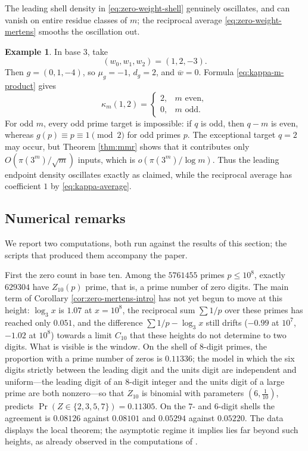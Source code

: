 \documentclass[11pt,reqno]{amsart}
\theoremstyle{plain}
\theoremstyle{definition}
\newtheorem{example}[theorem]{Example}
\newcommand{\1}{\mathbf 1}
\begin{document}
The leading shell density in \eqref{eq:zero-weight-shell} genuinely oscillates, and can vanish on entire residue classes of $m$; the reciprocal average \eqref{eq:zero-weight-mertens} smooths the oscillation out.

\begin{example}\label{ex:alternating-shells}
In base $3$, take
\[
 (w_0,w_1,w_2)=(1,2,-3).
\]
Then $g=(0,1,-4)$, so $\mu_g=-1$, $d_g=2$, and $\overline w=0$.  Formula \eqref{eq:kappa-m-product} gives
\[
 \kappa_m(1,2)=
 \begin{cases}
 2,&m\text{ even},\\
 0,&m\text{ odd}.
 \end{cases}
\]
For odd $m$, every odd prime target is impossible: if $q$ is odd, then $q-m$ is even, whereas $g(p)\equiv p\equiv1\pmod2$ for odd primes $p$.  The exceptional target $q=2$ may occur, but Theorem \ref{thm:mmr} shows that it contributes only $O(\pi(3^m)/\sqrt m)$ inputs, which is $o(\pi(3^m)/\log m)$.  Thus the leading endpoint density oscillates exactly as claimed, while the reciprocal average has coefficient $1$ by \eqref{eq:kappa-average}.
\end{example}

\subsection{Numerical remarks}\label{sec:numerics}
We report two computations, both run against the results of this section; the scripts that produced them accompany the paper.

First the zero count in base ten.  Among the $5761455$ primes $p\le10^{8}$, exactly $629304$ have $Z_{10}(p)$ prime, that is, a prime number of zero digits.  The main term of Corollary \ref{cor:zero-mertens-intro} has not yet begun to move at this height: $\log_3x$ is $1.07$ at $x=10^{8}$, the reciprocal sum $\sum 1/p$ over these primes has reached only $0.051$, and the difference $\sum1/p-\log_3x$ still drifts ($-0.99$ at $10^{7}$, $-1.02$ at $10^{8}$) towards a limit $C_{10}$ that these heights do not determine to two digits.  What is visible is the window.  On the shell of $8$-digit primes, the proportion with a prime number of zeros is $0.11336$; the model in which the six digits strictly between the leading digit and the units digit are independent and uniform---the leading digit of an $8$-digit integer and the units digit of a large prime are both nonzero---so that $Z_{10}$ is binomial with parameters $(6,\tfrac1{10})$, predicts $\Pr(Z\in\{2,3,5,7\})=0.11305$.  On the $7$- and $6$-digit shells the agreement is $0.08126$ against $0.08101$ and $0.05294$ against $0.05220$.  The data displays the local theorem; the asymptotic regime it implies lies far beyond such heights, as already observed in the computations of \cite[Section 6.5]{vibefrtz}.
\end{document}
